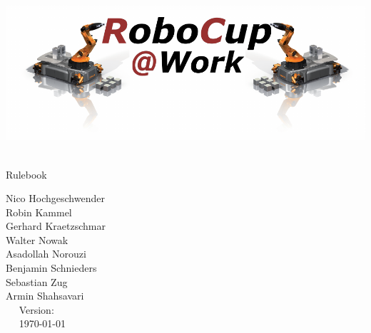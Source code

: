 
\begin{titlepage}
  \begin{center}
    {
      
      \includegraphics[width=\textwidth]{images/logo_RoboCupAtWork.pdf}\\[1.23ex]
    }
    \vspace{2.7 cm}
    \hrulefill\par
    {%
      \vspace*{.27cm}
      \Huge{\RCAW}\\[1.23ex]
      \Large Rulebook \\[2ex]
    }
    



    \hrulefill\par
    
    \vfill

    
	Nico Hochgeschwender\\
	Robin Kammel\\
	Gerhard Kraetzschmar\\
	Walter Nowak\\
	Asadollah Norouzi\\
	Benjamin Schnieders\\
	Sebastian Zug\\
	Armin Shahsavari\\
    
    \vfill
    ~~ Version: \YEAR ~~ \\
    ~~  \today ~~ \\
  \end{center}
\end{titlepage}
